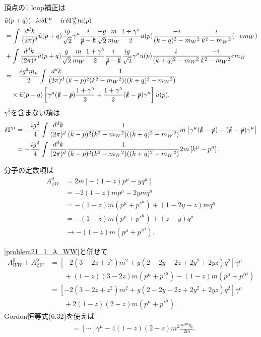 頂点の1 loop補正は
\begin{align*}
  & \bar{u}(p+q) (-ie\delta\Gamma^\mu-ie\delta\Gamma_5^\mu) u(p) \\
  &= \int \frac{d^dk}{(2\pi)^d} \bar{u}(p+q) \frac{ig}{\sqrt{2}} \gamma^\mu \frac{i}{\slashed{p}-\slashed{k}} \frac{-g}{\sqrt{2}} \frac{m}{m_W} \frac{1+\gamma^5}{2} u(p)
  \frac{-i}{(k+q)^2-m_W{}^2} \frac{i}{k^2-m_W{}^2} (-em_W) \\
  &+ \int \frac{d^dk}{(2\pi)^d} \bar{u}(p+q) \frac{g}{\sqrt{2}} \frac{m}{m_W} \frac{1+\gamma^5}{2} \frac{i}{\slashed{p}-\slashed{k}} \frac{ig}{\sqrt{2}} \gamma^\mu  u(p)
  \frac{i}{(k+q)^2-m_W{}^2} \frac{-i}{k^2-m_W{}^2} em_W \\
  &= -\frac{eg^2m_\mu}{2} \int \frac{d^dk}{(2\pi)^d} \frac{1}{(k-p)^2 (k^2 - m_W{}^2) ((k+q)^2 - m_W{}^2)} \\
  &\quad\times \bar{u}(p+q) \left[ \gamma^\mu (\slashed{k}-\slashed{p}) \frac{1+\gamma^5}{2} + \frac{1+\gamma^5}{2} (\slashed{k}-\slashed{p}) \gamma^\mu \right] u(p) .
\end{align*}
\(\gamma^5\)を含まない項は
\begin{align*}
  \delta\Gamma^\mu
  &= -\frac{ig^2}{4} \int \frac{d^dk}{(2\pi)^d} \frac{1}{(k-p)^2 (k^2 - m_W{}^2) ((k+q)^2 - m_W{}^2)} m
  \left[ \gamma^\mu (\slashed{k}-\slashed{p}) + (\slashed{k}-\slashed{p}) \gamma^\mu \right] \\
  &= -\frac{ig^2}{4} \int \frac{d^dk}{(2\pi)^d} \frac{1}{(k-p)^2 (k^2 - m_W{}^2) ((k+q)^2 - m_W{}^2)} 2m
  \left[ k^\mu - p^\mu \right] .
\end{align*}

分子の定数項は
\begin{align*}
  A_{\phi W}^0 &= 2m \left[ -(1-z) p^\mu - y q^\mu \right] \\
  &= - 2(1-z) m p^\mu - 2ym q^\mu \\
  &= - (1-z) m (p^\mu+p'^\mu) + (1-2y-z)m q^\mu \\
  &= - (1-z) m (p^\mu+p'^\mu) + (z-y) q^\mu \\
  &\to - (1-z) m (p^\mu+p'^\mu) .
\end{align*}

\eqref{problem21_1_A_WW}と併せて
\begin{align*}
  A_{WW}^0 + A_{\phi W}^0 &=
  \left[-2(3-2z+z^2)m^2 + y(2-2y-2z+2y^2+2yz)q^2\right] \gamma^\mu \\
  &\qquad + (1-z)(3-2z)m (p^\mu+p'^\mu) - (1-z) m (p^\mu+p'^\mu) \\
  &= \left[-2(3-2z+z^2)m^2 + y(2-2y-2z+2y^2+2yz)q^2\right] \gamma^\mu \\
  &\qquad + 2(1-z)(2-z) m (p^\mu+p'^\mu) .
\end{align*}
Gordon恒等式(6.32)を使えば
\begin{align*}
  &= [\cdots] \gamma^\mu - 4(1-z)(2-z) m^2 \frac{i\sigma^{\mu\nu}q_\nu}{2m} .
\end{align*}

